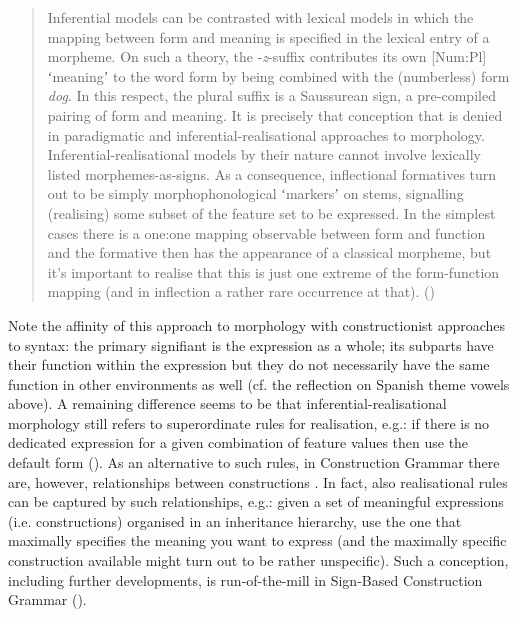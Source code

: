 \documentclass[output=paper]{langsci/langscibook}
\begin{document}
\begin{quote}
Inferential models can be contrasted with lexical models in which the mapping between form and meaning is specified in the lexical entry of a morpheme. On such a theory, the \nobreakdash-\textit{z}{}-suffix contributes its own [Num:Pl] ʻmeaningʼ to the word form by being combined with the (numberless) form \textit{dog}. In this respect, the plural suffix is a Saussurean sign, a pre-compiled pairing of form and meaning. It is precisely that conception that is denied in paradigmatic and inferential-realisational approaches to morphology. Inferential-realisational models by their nature cannot involve lexically listed mor\-phemes-as-signs. As a consequence, inflectional formatives turn out to be simply morphophonological ʻmarkersʼ on stems, signalling (realising) some subset of the feature set to be expressed. In the simplest cases there is a one:one mapping observable between form and function and the formative then has the appearance of a classical morpheme, but it’s important to realise that this is just one extreme of the form-function mapping (and in inflection a rather rare occurrence at that). (\citealt[280--281]{Spencer2001})
\end{quote}

\begin{sloppypar}
Note the affinity of this approach to morphology with constructionist approaches to syntax: the primary signifiant is the expression as a whole; its subparts have their function within the expression but they do not necessarily have the same function in other environments as well (cf. the reflection on Spanish theme vowels above). A remaining difference seems to be that inferential-realisational morphology still refers to superordinate rules for realisation, e.g.: if there is no dedicated expression for a given combination of feature values then use the default form (\citealt[280, 289]{Spencer2001}). As an alternative to such rules, in Construction Grammar there are, however, relationships between constructions \citep[109]{Goldberg1995}. In fact, also realisational rules can be captured by such relationships, e.g.: given a set of meaningful expressions (i.e. constructions) organised in an inheritance hierarchy, use the one that maximally specifies the meaning you want to express (and the maximally specific construction available might turn out to be rather unspecific). Such a conception, including further developments, is run-of-the-mill in Sign-Based Construction Grammar (\citealt[9--14]{SagEtAl2012}).
\end{sloppypar}\largerpage
\end{document}
